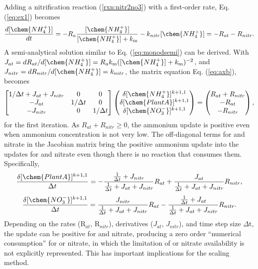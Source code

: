 \documentclass[gmd, manuscript]{copernicus}
\begin{document}
Adding a nitrification reaction (\ref{rxn:nitr2no3}) with a first-order rate,
Eq. (\ref{eq:ex1}) becomes
\begin{equation}
\frac{d[\chem{NH_4^+}]}{dt} =- R_a
\frac{[\chem{NH_4^+}]}{[\chem{NH_4^+}]+k_\text{m}}
- k_{nitr} [\chem{NH_4^+}] = -R_{at} - R_{nitr}.
\label{eq:ex2}
\end{equation}
A semi-analytical solution similar to Eq. (\ref{eq:monodsemi}) can be derived. With $J_{at} =
dR_{at}/d[\chem{NH_4^+}] = R_ak_\text{m}([\chem{NH_4^+}] +
k_\text{m})^{-2}$, and $J_{nitr} = dR_{nitr}/d[\chem{NH_4^+}]=k_{nitr}$,
the matrix
equation Eq. (\ref{eq:axb}), becomes 
\begin{equation}
\left[
\begin{matrix}
1/\Delta t + J_{at} + J_{nitr} & 0 & 0 \\
-J_{at} & 1/\Delta t & 0 \\
-J_{nitr} & 0 & 1/\Delta t \\
\end{matrix}
\right]
\left(
\begin{matrix}
\delta [\chem{NH_4^+}]^{k+1,1} \\
\delta [\chem{PlantA}]^{k+1,1} \\
\delta [\chem{NO_3^-}]^{k+1,1} 
\end{matrix}
\right)
=
\left(
\begin{matrix}
R_{at} + R_{nitr} \\
-R_{at} \\
-R_{nitr} 
\end{matrix}
\right),
\label{eq:test2}
\end{equation}
for the first iteration. As $R_{at} + R_{nitr} \geq 0$, the ammonium update is positive even when ammonium concentration is not very low. 
The off-diagonal terms for  and nitrate in the Jacobian matrix bring the positive ammonium update into the updates for  and nitrate even though there is no reaction that consumes them. Specifically, 
\begin{equation}
\frac{\delta [\chem{PlantA}]^{k+1,1}}{\Delta t} 
= -\frac{\frac{1}{\Delta t} + J_{nitr}}{\frac{1}{\Delta t} + J_{at} + J_{nitr}}
R_{at} + \frac{J_{at} }{\frac{1}{\Delta t} + J_{at} + J_{nitr}} R_{nitr},
\end{equation}
\begin{equation}
\frac{\delta [\chem{NO_3^-}]^{k+1,1}}{\Delta t}
= \frac{J_{nitr}}{\frac{1}{\Delta t} + J_{at} + J_{nitr}} R_{at} -
\frac{\frac{1}{\Delta t} + J_{at} }{\frac{1}{\Delta t} + J_{at} + J_{nitr}}
R_{nitr}.
\end{equation}
Depending on the rates
(R$_{at}$, R$_{nitr}$), derivatives ($J_{at}$, $J_{nitr}$), and time step size
$\Delta$t, the update can be positive for  and nitrate, producing a zero order ``numerical consumption'' for  or nitrate, in which the limitation of  or nitrate availability is not explicitly represented. This has important implications for the scaling method.
\end{document}
